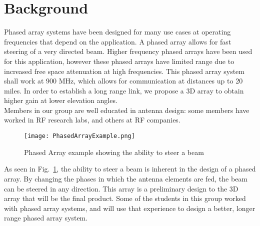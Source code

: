 \documentclass[UROP.tex]{subfiles}
\begin{document}
\bigskip
\section{\Large Background}
	Phased array systems have been designed for many use cases at operating frequencies that depend on the application.  A phased array allows for fast steering of a very directed beam.  Higher frequency phased arrays have been used for this application, however these phased arrays have limited range due to increased free space attenuation at high frequencies.  This phased array system shall work at 900 MHz, which allows for communication at distances up to 20 miles.  In order to establish a long range link, we propose a 3D array to obtain higher gain at lower elevation angles. \\
	
	Members in our group are well educated in antenna design: some members have worked in RF research labs, and others at RF companies.  
	
\begin{figure}[H]
\centering
	\texttt{[image: PhasedArrayExample.png]}
	\caption{ Phased Array example showing the ability to steer a beam\label{fig:PAexample}}
\end{figure}
	
	As seen in Fig.~\ref{fig:PAexample}, the ability to steer a beam is inherent in the design of a phased array.  By changing the phases in which the antenna elements are fed, the beam can be steered in any direction. This array is a preliminary design to the 3D array that will be the final product.  Some of the students in this group worked with phased array systems, and will use that experience to design a better, longer range phased array system.  
\end{document}

